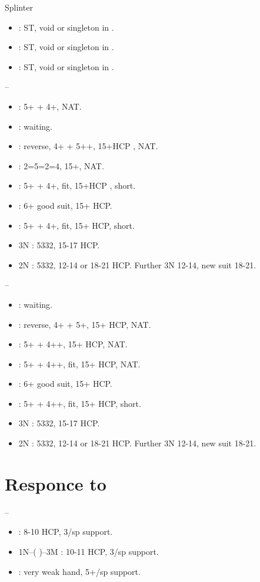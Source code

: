 \documentclass[12pt,twoside,a5paper]{report}%
\begin{document}
	Splinter
	\begin{itemize}
	\renewcommand{\labelitemi}{}
	\item {}: ST, void or singleton in \cl{}.
	\item {}: ST, void or singleton in \di{}.
	\item {}: ST, void or singleton in \sp{}.
	\end{itemize}

	--
	\begin{itemize}
	\renewcommand{\labelitemi}{}
	\item {} : 5+\he{} + 4+\di{}, NAT.
	\item {} : waiting.
	\item {} : reverse, 4+\sp{} + 5+\he{}+, 15+HCP , NAT.
	\item {} : 2=5=2=4, 15+, NAT.
	\item {} : 5+\he{} + 4+\cl{}, fit, 15+HCP , short\di{}.
	\item {} : 6+\he{} good suit, 15+ HCP.
	\item {} : 5+\he{} + 4+\cl{}, fit, 15+ HCP, short\sp{}.
	\item 3N : 5332, 15-17 HCP.
	\item 2N : 5332, 12-14 or 18-21 HCP. Further 3N 12-14, new suit 18-21.
	\end{itemize}

	--
	\begin{itemize}
	\renewcommand{\labelitemi}{}
	\item {} : waiting.
	\item {} : reverse, 4+\sp{} + 5+\he{}, 15+ HCP, NAT.
	\item {} : 5+\he{} + 4+\cl{}+, 15+ HCP, NAT.
	\item {} : 5+\he{} + 4+\di{}+, fit, 15+ HCP, NAT.
	\item {} : 6+\he{} good suit, 15+ HCP.
	\item {} : 5+\he{} + 4+\di{}+, fit, 15+ HCP, short\sp{}.
	\item 3N : 5332, 15-17 HCP.
	\item 2N : 5332, 12-14 or 18-21 HCP. Further 3N 12-14, new suit 18-21.
	\end{itemize}

	\chapter*{Responce to }
	-- \\
	\begin{itemize}
	\renewcommand{\labelitemi}{}
	\item {} : 8-10 HCP, 3/sp{} support.
	\item 1N--( )--3M : 10-11 HCP, 3/sp{} support.
	\item {} : very weak hand, 5+/sp{} support.
	\end{itemize}
\end{document}
